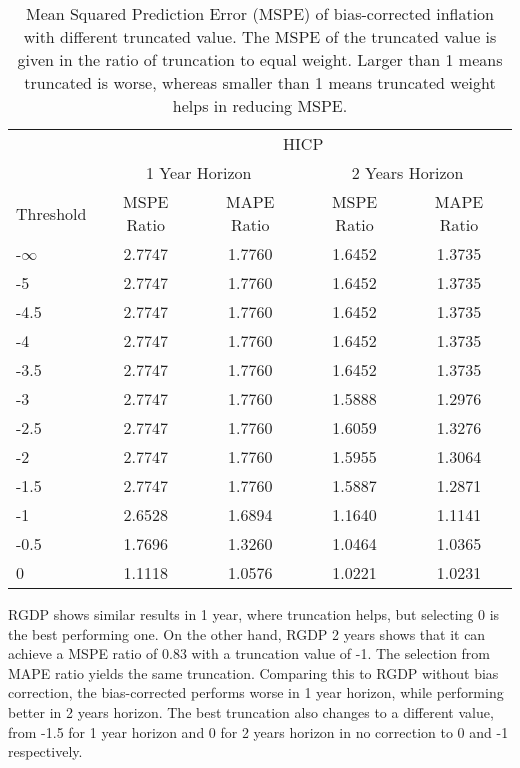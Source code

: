 \documentclass[11pt]{article}
\begin{document}
\begin{table}[!h]
	\centering
	\caption{Mean Squared Prediction Error (MSPE) of bias-corrected inflation with different truncated value. The MSPE of the truncated value is given in the ratio of truncation to equal weight. Larger than 1 means truncated is worse, whereas smaller than 1 means truncated weight helps in reducing MSPE.}
	\label{tab: MSPE HICP bias}
	\begin{tabular}{lcccc}
		\hline
		&                        \multicolumn{4}{c}{HICP}                         \\
		\cmidrule(lr){2-5}                              & \multicolumn{2}{c}{1 Year Horizon} & \multicolumn{2}{c}{2 Years Horizon} \\
		\cmidrule(lr){2-3} \cmidrule(lr){4-5}
		Threshold & MSPE Ratio & MAPE Ratio  & MSPE Ratio & MAPE Ratio  \\ \hline
		-$\infty$ & 2.7747 & 1.7760 & 1.6452 & 1.3735\\ 
		-5 & 2.7747 & 1.7760 & 1.6452 & 1.3735\\ 
		-4.5 & 2.7747 & 1.7760 & 1.6452 & 1.3735\\ 
		-4 & 2.7747 & 1.7760 & 1.6452 & 1.3735\\ 
		-3.5 & 2.7747 & 1.7760 & 1.6452 & 1.3735\\ 
		-3 & 2.7747 & 1.7760 & 1.5888 & 1.2976\\ 
		-2.5 & 2.7747 & 1.7760 & 1.6059 & 1.3276\\ 
		-2 & 2.7747 & 1.7760 & 1.5955 & 1.3064\\ 
		-1.5 & 2.7747 & 1.7760 & 1.5887 & 1.2871\\ 
		-1 & 2.6528 & 1.6894 & 1.1640 & 1.1141\\ 
		-0.5 & 1.7696 & 1.3260 & 1.0464 & 1.0365\\ 
		0 & 1.1118 & 1.0576 & 1.0221 & 1.0231\\ \hline
	\end{tabular}
\end{table}


RGDP shows similar results in 1 year, where truncation helps, but selecting 0 is the best performing one. On the other hand, RGDP 2 years shows that it can achieve a MSPE ratio of 0.83 with a truncation value of -1. The selection from MAPE ratio yields the same truncation. Comparing this to RGDP without bias correction, the bias-corrected performs worse in 1 year horizon, while performing better in 2 years horizon. The best truncation also changes to a different value, from -1.5 for 1 year horizon and 0 for 2 years horizon in no correction to 0 and -1 respectively.
\end{document}
